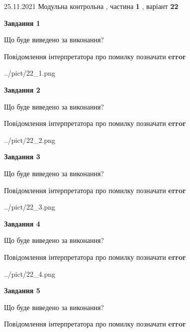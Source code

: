 \documentclass[10pt, ukrainian]{article}
\begin{document}
{25.11.2021 Модульна контрольна , частина \textbf { 1 }, варіант  \No \textbf { 22 }\par}
{
\begin {large}

{\begin {center}\textbf{Завдання 1}\end {center}}\par
Що буде виведено за виконання? \par
Повідомлення інтерпретатора про помилку позначати \textbf{error}

\begin{center}
	{../pict/22_1.png}
\end{center}
\newpage

{\begin {center}\textbf{Завдання 2}\end {center}}\par
Що буде виведено за виконання? \par
Повідомлення інтерпретатора про помилку позначати \textbf{error}

\begin{center}
	{../pict/22_2.png}
\end{center}
\newpage

{\begin {center}\textbf{Завдання 3}\end {center}}\par
Що буде виведено за виконання? \par
Повідомлення інтерпретатора про помилку позначати \textbf{error}

\begin{center}
	{../pict/22_3.png}
\end{center}
\newpage

{\begin {center}\textbf{Завдання 4}\end {center}}\par
Що буде виведено за виконання? \par
Повідомлення інтерпретатора про помилку позначати \textbf{error}

\begin{center}
	{../pict/22_4.png}
\end{center}
\newpage

{\begin {center}\textbf{Завдання 5}\end {center}}\par
Що буде виведено за виконання? \par
Повідомлення інтерпретатора про помилку позначати \textbf{error}


\end{large}}
\end{document}
